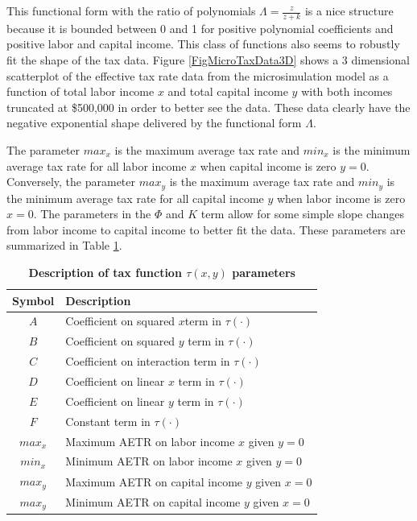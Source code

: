 \documentclass[letterpaper,12pt]{article}
\theoremstyle{definition}
\begin{document}
\begin{spacing}{1.5}
    This functional form with the ratio of polynomials $\Lambda = \frac{z}{z + k}$ is a nice structure because it is bounded between 0 and 1 for positive polynomial coefficients and positive labor and capital income. This class of functions also seems to robustly fit the shape of the tax data. Figure \ref{FigMicroTaxData3D} shows a 3 dimensional scatterplot of the effective tax rate data from the microsimulation model as a function of total labor income $x$ and total capital income $y$ with both incomes truncated at \$500,000 in order to better see the data. These data clearly have the negative exponential shape delivered by the functional form $\Lambda$.

    The parameter $max_x$ is the maximum average tax rate and $min_x$ is the minimum average tax rate for all labor income $x$ when capital income is zero $y=0$. Conversely, the parameter $max_y$ is the maximum average tax rate and $min_y$ is the minimum average tax rate for all capital income $y$ when labor income is zero $x=0$. The parameters in the $\Phi$ and $K$ term allow for some simple slope changes from labor income to capital income to better fit the data. These parameters are summarized in Table \ref{TabTaxParams}.


    \begin{table}[htbp] \centering \captionsetup{width=3.8in}
    \caption{\label{TabTaxParams}\textbf{Description of tax function $\tau(x,y)$ parameters}}
      \begin{threeparttable}
      \begin{tabular}{>{\footnotesize}c |>{\footnotesize}l }
        \hline\hline
        Symbol & \quad\quad\quad\quad Description  \\
        \hline
        $A$ & Coefficient on squared $x $term in $\tau(\cdot)$  \\
        $B$ & Coefficient on squared $y$ term in $\tau(\cdot)$  \\
        $C$ & Coefficient on interaction term in $\tau(\cdot)$  \\
        $D$ & Coefficient on linear $x$ term in $\tau(\cdot)$  \\
        $E$ & Coefficient on linear $y$ term in $\tau(\cdot)$  \\
        $F$ & Constant term in $\tau(\cdot)$\\
        $max_x$ & Maximum AETR on labor income $x$ given $y=0$  \\
        $min_x$ & Minimum AETR on labor income $x$ given $y=0$ \\
        $max_y$ & Maximum AETR on capital income $y$ given $x=0$ \\
        $max_y$ & Minimum AETR on capital income $y$ given $x=0$ \\
        \hline\hline
      \end{tabular}
      \end{threeparttable}
    \end{table}


\end{spacing}
\end{document}
